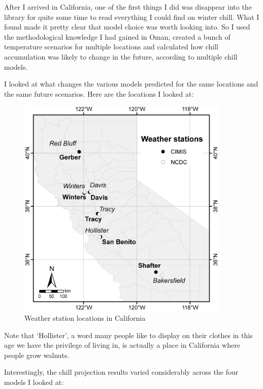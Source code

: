 \documentclass[
]{book}
\begin{document}
After I arrived in California, one of the first things I did was disappear into the library for quite some time to read everything I could find on winter chill. What I found made it pretty clear that model choice was worth looking into. So I used the methodological knowledge I had gained in Oman, created a bunch of temperature scenarios for multiple locations and calculated how chill accumulation was likely to change in the future, according to multiple chill models.

I looked at what changes the various models predicted for the same locations and the same future scenarios. Here are the locations I looked at:

\begin{figure}
\centering
\includegraphics[width=0.9\textwidth,height=\textheight]{pictures/Luedeling_Figure_1.jpg}
\caption{Weather station locations in California}
\end{figure}

Note that `Hollister', a word many people like to display on their clothes in this age we have the privilege of living in, is actually a place in California where people grow walnuts.

Interestingly, the chill projection results varied considerably across the four models I looked at:
\end{document}
